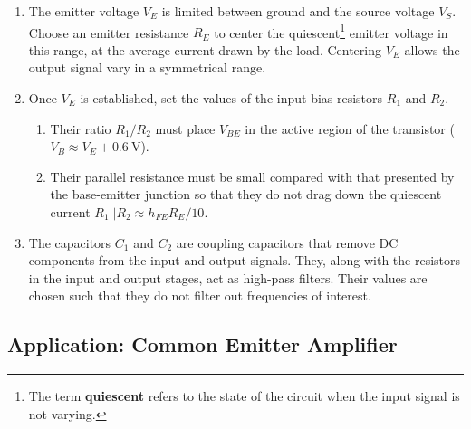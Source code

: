 \documentclass[11pt]{article}
\begin{document}
\begin{enumerate}
\item The emitter voltage $V_E$ is limited between ground and the
  source voltage $V_S$. Choose an emitter resistance $R_E$ to center
  the quiescent\footnote{The term \textbf{quiescent} refers to the
    state of the circuit when the input signal is not varying.}
  emitter voltage in this range, at the average current
  drawn by the load. Centering $V_E$ allows the output signal vary in
  a symmetrical range.

\item Once $V_E$ is established, set the values of the input bias
  resistors $R_1$ and $R_2$.
  \begin{enumerate}
  \item Their ratio $R_1/R_2$ must place $V_{BE}$ in the active region
    of the transistor ($V_B \approx V_E + 0.6~\mathrm{V}$).

  \item Their parallel resistance must be small compared with that
    presented by the base-emitter junction so that they do not drag 
    down the quiescent current $R_1 || R_2 \approx h_{FE} R_E/ 10$. 
  \end{enumerate}

\item The capacitors $C_1$ and $C_2$ are coupling capacitors that
  remove DC components from the input and output signals. They, along
  with the resistors in the input and output stages, act as high-pass 
  filters. Their values are chosen such that they do not filter out
  frequencies of interest.
\end{enumerate}

\subsection{Application: Common Emitter Amplifier}
\label{sec:commonemitter}
\end{document}
